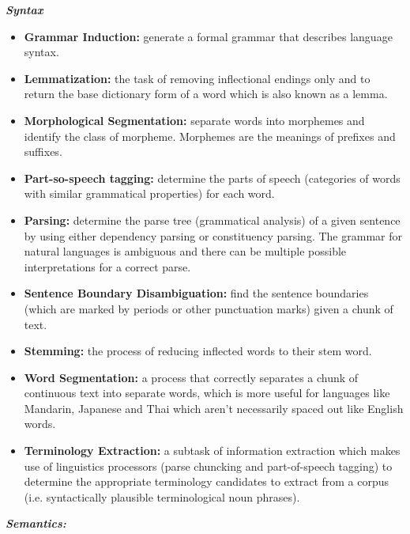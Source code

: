 \documentclass{article}
\begin{document}
\vspace{0.25cm}

\hspace{-0.4cm} \textbf{\textit{Syntax}}

\begin{itemize}
    \item \textbf{Grammar Induction:} generate a formal grammar that describes language syntax. 
    \item \textbf{Lemmatization:} the task of removing inflectional endings only and to return the base dictionary form of a word which is also known as a lemma.
    \item \textbf{Morphological Segmentation:} separate words into morphemes and identify the class of morpheme. Morphemes are the meanings of prefixes and suffixes. 
    \item \textbf{Part-so-speech tagging:} determine the parts of speech (categories of words with similar grammatical properties) for each word.
    \item \textbf{Parsing:} determine the parse tree (grammatical analysis) of a given sentence by using either dependency parsing or constituency parsing. The grammar for natural languages is ambiguous and there can be multiple possible interpretations for a correct parse.   
    \item \textbf{Sentence Boundary Disambiguation:} find the sentence boundaries (which are marked by periods or other punctuation marks) given a chunk of text.
    \item \textbf{Stemming:} the process of reducing inflected words to their stem word. 
    \item \textbf{Word Segmentation:} a process that correctly separates a chunk of continuous text into separate words, which is more useful for languages like Mandarin, Japanese and Thai which aren't necessarily spaced out like English words. 
    \item \textbf{Terminology Extraction:} a subtask of information extraction which makes use of linguistics processors (parse chuncking and part-of-speech tagging) to determine the appropriate terminology candidates to extract from a corpus (i.e. syntactically plausible terminological noun phrases).
\end{itemize}

\newpage 

\hspace{-0.4cm} \textbf{\textit{Semantics:}} 

\vspace{0.25cm}
\end{document}
